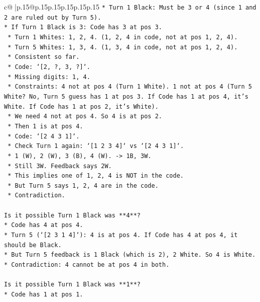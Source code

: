 \documentclass{article}
\begin{document}
{\begin{supertabular}{c@{$\;$}|p{.15\linewidth}@{}p{.15\linewidth}p{.15\linewidth}p{.15\linewidth}p{.15\linewidth}p{.15\linewidth}}
{{{\texttt{*   Turn 1 Black: Must be 3 or 4 (since 1 and 2 are ruled out by Turn 5).} \\
\texttt{*   If Turn 1 Black is 3: Code has 3 at pos 3.} \\
\texttt{    *   Turn 1 Whites: 1, 2, 4. (1, 2, 4 in code, not at pos 1, 2, 4).} \\
\texttt{    *   Turn 5 Whites: 1, 3, 4. (1, 3, 4 in code, not at pos 1, 2, 4).} \\
\texttt{    *   Consistent so far.} \\
\texttt{    *   Code: `{[}2, ?, 3, ?{]}`.} \\
\texttt{    *   Missing digits: 1, 4.} \\
\texttt{    *   Constraints: 4 not at pos 4 (Turn 1 White). 1 not at pos 4 (Turn 5 White? No, Turn 5 guess has 1 at pos 3. If Code has 1 at pos 4, it's White. If Code has 1 at pos 2, it's White).} \\
\texttt{    *   We need 4 not at pos 4. So 4 is at pos 2.} \\
\texttt{    *   Then 1 is at pos 4.} \\
\texttt{    *   Code: `{[}2 4 3 1{]}`.} \\
\texttt{    *   Check Turn 1 again: `{[}1 2 3 4{]}` vs `{[}2 4 3 1{]}`.} \\
\texttt{        *   1 (W), 2 (W), 3 (B), 4 (W). {-}> 1B, 3W.} \\
\texttt{        *   Still 3W. Feedback says 2W.} \\
\texttt{        *   This implies one of 1, 2, 4 is NOT in the code.} \\
\texttt{        *   But Turn 5 says 1, 2, 4 are in the code.} \\
\texttt{        *   Contradiction.} \\
\\ 
\texttt{Is it possible Turn 1 Black was **4**?} \\
\texttt{*   Code has 4 at pos 4.} \\
\texttt{*   Turn 5 (`{[}2 3 1 4{]}`): 4 is at pos 4. If Code has 4 at pos 4, it should be Black.} \\
\texttt{*   But Turn 5 feedback is 1 Black (which is 2), 2 White. So 4 is White.} \\
\texttt{*   Contradiction: 4 cannot be at pos 4 in both.} \\
\\ 
\texttt{Is it possible Turn 1 Black was **1**?} \\
\texttt{*   Code has 1 at pos 1.} \\
}}}
\end{supertabular}}
\end{document}

